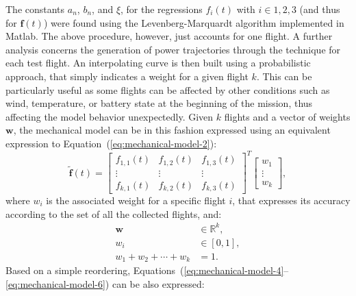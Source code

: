 The constants $a_n$, $b_n$, and $\xi$, for the regressions $f_i(t)$ with $i\in{1,2,3}$ (and thus for $\mathbf{f}(t)$) were found using the Levenberg-Marquardt algorithm implemented in Matlab. The above procedure, however, just accounts for one flight. A further analysis concerns the generation of power trajectories through the technique for each test flight. An interpolating curve is then built using a probabilistic approach, that simply indicates a weight for a given flight $k$. This can be particularly useful as some flights can be affected by other conditions such as wind, temperature, or battery state at the beginning of the mission, thus affecting the model behavior unexpectedly. Given $k$ flights and a vector of weights $\mathbf{w}$, the mechanical model can be in this fashion expressed using an equivalent expression to Equation~(\ref{eq:mechanical-model-2}):
\begin{equation}\label{eq:mechanical-model-5}
  \widetilde{\mathbf{f}}(t)=
  \begin{bmatrix}
    f_{1,1}(t)& f_{1,2}(t)& f_{1,3}(t)\\
    \vdots& \vdots& \vdots\\
    f_{k,1}(t)& f_{k,2}(t)& f_{k,3}(t)
  \end{bmatrix}^T
  \begin{bmatrix}
    w_1\\
    \vdots\\
    w_k
  \end{bmatrix},
\end{equation}
where $w_i$ is the associated weight for a specific flight $i$, that expresses its accuracy according to the set of all the collected flights, and: 
\begin{equation}\label{eq:mechanical-model-6}
  \begin{split}
    \mathbf{w}&\in\mathbb{R}^k,\\
    w_i&\in[0,1],\\
    w_1+w_2+\cdots+w_k&=1.
  \end{split}
\end{equation}
Based on a simple reordering, Equations~(\ref{eq:mechanical-model-4}--\ref{eq:mechanical-model-6}) can be also expressed:
